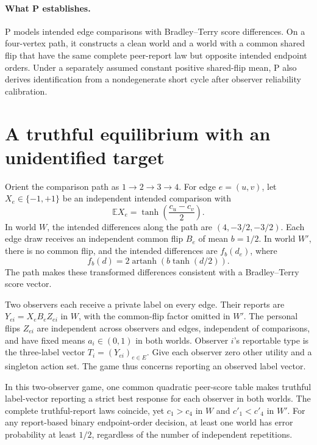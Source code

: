 \documentclass{article}
\begin{document}
\paragraph{What P establishes.}
P models intended edge comparisons with Bradley--Terry score differences. On a four-vertex path, it
constructs a clean world and a world with a common shared flip that have the same complete peer-report
law but opposite intended endpoint orders. Under a separately assumed constant positive shared-flip mean,
P also derives identification from a nondegenerate short cycle after observer reliability calibration.

\section{A truthful equilibrium with an unidentified target}

Orient the comparison path as \(1\to2\to3\to4\). For edge \(e=(u,v)\), let \(X_e\in\{-1,+1\}\) be an
independent intended comparison with
\[
\mathbb E X_e=\tanh\!\left(\frac{c_u-c_v}{2}\right).
\]
In world \(W\), the intended differences along the path are \((4,-3/2,-3/2)\). Each edge draw receives an
independent common flip \(B_e\) of mean \(b=1/2\). In world \(W'\), there is no common flip, and the
intended differences are \(f_b(d_e)\), where
\[
f_b(d)=2\operatorname{artanh}\!\left(b\tanh(d/2)\right).
\]
The path makes these transformed differences consistent with a Bradley--Terry score vector.

Two observers each receive a private label on every edge. Their reports are \(Y_{ei}=X_eB_eZ_{ei}\) in
\(W\), with the common-flip factor omitted in \(W'\). The personal flips \(Z_{ei}\) are independent
across observers and edges, independent of comparisons, and have fixed means \(a_i\in(0,1)\) in both
worlds. Observer \(i\)'s reportable type is the three-label vector \(T_i=(Y_{ei})_{e\in E}\). Give each
observer zero other utility and a singleton action set. The game thus concerns reporting an observed
label vector. %

\begin{proposition}
In this two-observer game, one common quadratic peer-score table makes truthful label-vector reporting a
strict best response for each observer in both worlds. The complete truthful-report laws coincide, yet
\(c_1>c_4\) in \(W\) and \(c'_1<c'_4\) in \(W'\). For any report-based binary endpoint-order decision, at
least one world has error probability at least \(1/2\), regardless of the number of independent
repetitions. %
\end{proposition}
\end{document}
